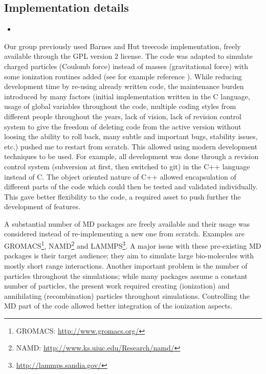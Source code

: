 \subsection{Implementation details}
\begin{itemize}
\item {}
\end{itemize}

Our group previously used Barnes and Hut treecode implementation,
freely available\cite{treecode} through the GPL version 2 license. The code was adapted
to simulate charged particles (Coulomb force) instead of masses (gravitational
force) with some ionization routines added (see for example reference
\cite{Jungreuthmayer2005}). While reducing development time by re-using already
written code, the maintenance burden introduced by many factors (initial
implementation written in the C language, usage of global variables
throughout the code, multiple coding styles from different people throughout
the years, lack of vision, lack of revision control system to give the freedom
of deleting code from the active version without loosing the ability to roll
back, many subtle and important bugs, stability issues, etc.) pushed me
to restart from scratch. This allowed using modern development techniques to be
used. For example, all development was done through a revision control system
(subversion\cite{svn} at first, then switched to git\cite{git}) in the C++
language instead of C. The object oriented nature of C++ allowed encapsulation
of different parts of the code which could then be tested and validated
individually. This gave better flexibility to the code, a required asset to
push further the development of features.

A substantial number of MD packages are freely available and
their usage was considered instead of re-implementing a new one from scratch.
Examples are GROMACS\footnote{GROMACS:
\url{http://www.gromacs.org/}}, NAMD\footnote{NAMD:
\url{http://www.ks.uiuc.edu/Research/namd/}} and
LAMMPS\footnote{\url{http://lammps.sandia.gov/}}. A major issue with these
pre-existing MD packages is their target audience; they aim to simulate large
bio-molecules with mostly short range interactions. Another important problem
is the number of particles throughout the simulations; while many packages
assume a constant number of particles, the present work required creating
(ionization) and annihilating (recombination) particles throughout simulations.
Controlling the MD part of the code allowed better integration of the
ionization aspects.

